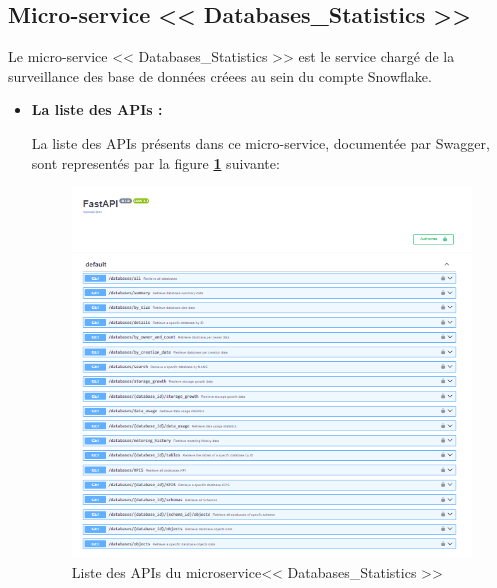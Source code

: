\subsection{Micro-service << Databases\_Statistics >>}
\par Le micro-service << Databases\_Statistics >> est le service chargé de la surveillance des base de données créees au sein du compte Snowflake.
\begin{itemize}
    \item \textbf{La liste des APIs :}
        \par La liste des APIs présents dans ce micro-service, documentée par Swagger, sont representés par la figure \textbf{\ref{fig:apiData}} suivante:
        \begin{figure}[H]
            \centering
            \includegraphics[width =1\linewidth]{img/captures/database_apis.PNG}
            \caption{Liste des APIs du microservice<< Databases\_Statistics >> }
                \label{fig:apiData}
        \end{figure}


\end{itemize}
